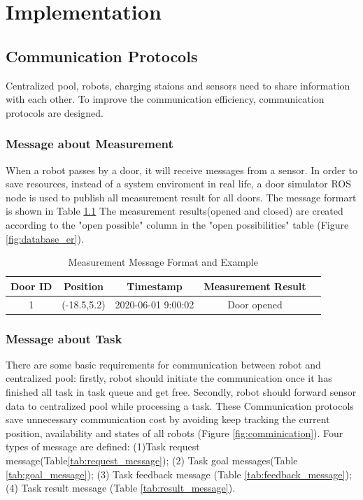 \chapter{Implementation}


\section{Communication Protocols}


Centralized pool, robots, charging staions and sensors need to share information with each other.
To improve the communication efficiency, communication protocols are designed. 

\subsection{Message about Measurement}
\label{sec:measurement_message}
When a robot passes by a door, it will receive messages from a sensor. 
In order to save resources, instead of a system enviroment in real life, a door simulator ROS node is used to publish all measurement result for all doors. The message formart is shown in Table \ref{tab:sensor_message} 
The measurement results(opened and closed) are created according to the "open possible" column in the "open possibilities" table (Figure \ref{fig:database_er}).

\begin{table}[htb]
\centering
\begin{tabular}{|c|c|c|c|c|} 
\hline
Door ID  & Position& Timestamp & Measurement Result \\
\hline\hline
1&(-18.5,5.2) & 2020-06-01 9:00:02 & Door opened \\ [1ex] 
\hline
\end{tabular}
\caption{Measurement Message Format and Example}
\label{tab:sensor_message}
\end{table}
	

\subsection{Message about Task}
\label{sec:task_message}
There are some basic requirements for communication between robot and centralized pool: firstly,
robot should initiate the communication once it has finished all task in task queue and get free. 
Secondly, robot should forward sensor data to centralized pool while processing a task. 
These Communication protocols save unnecessary communication cost by avoiding keep tracking the current position, availability and states of all robots (Figure \ref{fig:comminication}).
Four types of message are defined: 
(1)Task request message(Table\ref{tab:request_message}); (2) Task goal messages(Table \ref{tab:goal_message}); (3) Task feedback message (Table \ref{tab:feedback_message}); (4) Task result message (Table \ref{tab:result_message}). 

